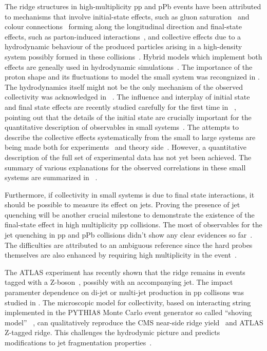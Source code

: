 The ridge structures in high-multiplicity pp and pPb events have been attributed to mechanisms that involve initial-state effects, such as gluon saturation~\cite{Dusling:2012cg,Bzdak:2013zma} and colour connections~\cite{Ortiz:2013yxa,Sarma:2019teo} forming along the longitudinal direction and final-state effects, such as parton-induced interactions~\cite{Arbuzov:2011yr}, and collective effects due to a hydrodynamic behaviour of the produced particles arising in a high-density system possibly formed in these collisions~\cite{Weller:2017tsr,Zhao:2017rgg}. 
Hybrid models which implement both effects are geneally used in hydrodynamic simulations~\cite{Greif:2017bnr,Mantysaari:2017cni}. 
The importance of the proton shape and its fluctuations to model the small system was recongnized in \cite{Mantysaari:2017cni}.
The hydrodynamics itself might not be the only mechanism of the observed collectivity was acknowledged in ~\cite{Zhao:2020pty}. 
The influence and interplay of initial state and final state effects are recently studied carefully for the first time in ~\cite{Greif:2019ygb}, pointing out that the details of the initial state are crucially important for the quantitative description of observables in small systems~\cite{Schenke:2019pmk}. 
The attempts to describe the collective effects systematically from the small to large systems are being made both for experiments~\cite{Acharya:2019vdf} and theory side~\cite{Greif:2019ygb}.
However, a quantitative description of the full set of experimental data has not yet been achieved.
The summary of various explanations for the observed correlations in these small systems are summarized in ~\cite{Strickland:2018exs,Loizides:2016tew,Nagle:2018nvi}.

Furthermore, if collectivity in small systems is due to final state interactions, it should be possible to measure its effect on jets. Proving the presence of jet quenching will be another crucial milestone to demonstrate the existence of the final-state effect in high multiplicity pp collisions. The most of observables for the jet quenching in pp and pPb collisions didn't show any clear evidences so far~\cite{Khachatryan:2016odn,Adam:2016jfp,Adam:2016dau,Acharya:2017okq}. The difficulties are attributed to an ambiguous reference since the hard probes themselves are also enhanced by requiring high multiplicity in the event~\cite{Adam:2016jfp,Acharya:2018egz}.

The ATLAS experiment has recently shown that the ridge remains in events tagged with a Z-boson~\cite{Aaboud:2019mcw}, possibly with an accompanying jet.
The impact paramenter dependence on di-jet or multi-jet production in pp collisons was studied in \cite{Frankfurt:2003td}.
The microscopic model for collectivity, based on interacting string implemented in the PYTHIA8 Monte Carlo event generator so called ``shoving model''~\cite{Bierlich:2017vhg} , can qualitatively reproduce the CMS near-side ridge yield~\cite{Khachatryan:2016txc} and ATLAS Z-tagged ridge. This challenges the hydrodymic picture and predicts modifications to jet fragmentation
properties~\cite{Bierlich:2019ixq}.

